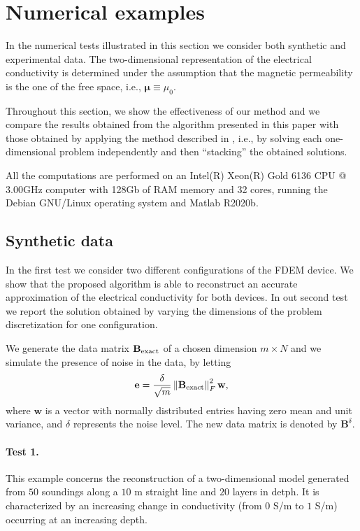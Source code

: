 \documentclass[final,leqno]{siamltex}
\newcommand{\norm}[1]{\left\| #1 \right\|}
\newcommand{\mub}{\boldsymbol{\mu}}
\newcommand{\bm}[1]{\mathbf{#1}}
\begin{document}
\section{Numerical examples}\label{sect:num}
In the numerical tests illustrated in this section we consider both synthetic and experimental data. The two-dimensional representation of the electrical conductivity is determined under the assumption that the magnetic permeability is the one of the free space, i.e., $\mub\equiv\mu_0$. 

Throughout this section, we show the effectiveness of our method and we compare the results obtained from the algorithm presented in this paper with those obtained by applying the method described in \cite{ddrv19}, i.e., by solving each one-dimensional problem independently and then ``stacking'' the obtained solutions.

All the computations are performed on an Intel(R) Xeon(R) Gold 6136 CPU @ 3.00GHz computer with 128Gb of RAM memory and 32 cores, running the Debian GNU/Linux operating system and Matlab R2020b.
\subsection{Synthetic data}
In the first test we consider two different configurations of the FDEM device. We show that the proposed algorithm is able to reconstruct an accurate approximation of the electrical conductivity for both devices. In out second test we report the solution obtained by varying the dimensions of the problem discretization for one configuration.

We generate the data matrix $\bm{B}_{\rm{exact}}$ of a chosen dimension $m \times N$ and we simulate the presence of noise in the data, by letting
$$
\bm{e} =\frac{\delta}{\sqrt{m}} \norm{\bm{B}_{\rm{exact}}}_F^2 \bm{w},
$$
where $\bm{w}$ is a vector with normally distributed entries having zero mean and unit variance, and $\delta$ represents the noise level. The new data matrix is denoted by $\bm{B}^\delta$.
\paragraph{Test 1.}
This example concerns the reconstruction of a two-dimensional model generated from $50$ soundings along a $10$ m straight line and $20$ layers in detph. It is characterized by an increasing change in conductivity (from $0$ S/m to $1$ S/m) occurring at an increasing depth. 
\end{document}
